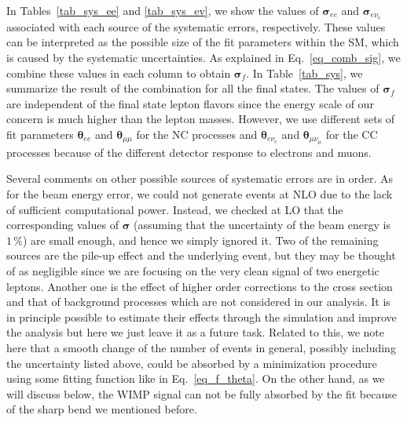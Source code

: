 \documentclass[12pt,twoside,book]{article}
\begin{document}
In Tables~\ref{tab_sys_ee} and \ref{tab_sys_ev}, we show the values of $\bm{\sigma}_{ee}$ and $\bm{\sigma}_{e\nu_e}$ associated with each source of the systematic errors, respectively.
These values can be interpreted as the possible size of the fit parameters within the SM, which is caused by the systematic uncertainties.
As explained in Eq.~\eqref{eq_comb_sig}, we combine these values in each column to obtain $\bm{\sigma}_f$.
In Table~\ref{tab_sys}, we summarize the result of the combination for all the final states.
The values of $\bm{\sigma}_f$ are independent of the final state lepton flavors since the energy scale of our concern is much higher than the lepton masses.
However, we use different sets of fit parameters $\bm{\theta}_{ee}$ and $\bm{\theta}_{\mu\mu}$ for the NC processes and $\bm{\theta}_{e\nu_e}$ and $\bm{\theta}_{\mu\nu_\mu}$ for the CC processes because of the different detector response to electrons and muons.

Several comments on other possible sources of systematic errors are in order.
As for the beam energy error, we could not generate events at NLO due to the lack of sufficient computational power.
Instead, we checked at LO that the corresponding values of $\bm{\sigma}$ (assuming that the uncertainty of the beam energy is $1\,\%$) are small enough, and hence we simply ignored it.
Two of the remaining sources are the pile-up effect and the underlying event, but they may be thought of as negligible since we are focusing on the very clean signal of two energetic leptons.
Another one is the effect of higher order corrections to the cross section and that of background processes which are not considered in our analysis.
It is in principle possible to estimate their effects through the simulation and improve the analysis but here we just leave it as a future task.
Related to this, we note here that a smooth change of the number of events in general, possibly including the uncertainty listed above, could be absorbed by a minimization procedure using some fitting function like in Eq.~\eqref{eq_f_theta}.
On the other hand, as we will discuss below, the WIMP signal can not be fully absorbed by the fit because of the sharp bend we mentioned before.
\end{document}

